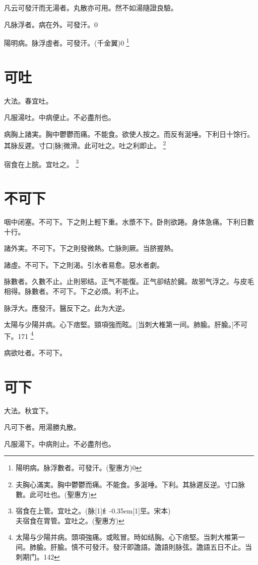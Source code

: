 \documentclass[11pt,oneside,b5paper]{ctexbook}
\begin{document}
\begin{flushleft}
凡云可發汗而无湯者。丸散亦可用。然不如湯隨證良驗。

凡脉浮者。病在外。可發汗。0

陽明病。脉浮虛者。可發汗。(千金翼)0
\footnote{陽明病。脉浮數者。可發汗。(聖惠方)0}

\section{可吐}

大法。春宜吐。

凡服湯吐。中病便止。不必盡剂也。

病胸上諸実。胸中鬱鬱而痛。不能食。欲使人按之。而反有涎唾。下利日十馀行。其脉反遲。寸口[脉]微滑。此可吐之。吐之利即止。
\footnote{夫胸心滿実。胸中鬱鬱而痛。不能食。多涎唾。下利。其脉遲反逆。寸口脉數。此可吐也。(聖惠方)}

宿食在上脘。宜吐之。
\footnote{宿食在上管。宜吐之。(脉{\hbox{\scalebox{0.68}[1]{纟}\kern-0.35em\scalebox{0.64}[1]{巠}}}。宋本)\\夫宿食在胃管。宜吐之。(聖惠方)}

\section{不可下}

咽中闭塞。不可下。下之則上輕下重。水漿不下。卧則欲踡。身体急痛。下利日數十行。

諸外実。不可下。下之則發微熱。亡脉則厥。当脐握熱。

諸虛。不可下。下之則渴。引水者易愈。惡水者劇。

脉數者。久數不止。止則邪结。正气不能復。正气卻结於臓。故邪气浮之。与皮毛相得。脉數者。不可下。下之必煩。利不止。

脉浮大。應發汗。醫反下之。此为大逆。

太陽与少陽并病。心下痞堅。頸項強而眩。[当刺大椎第一间。肺腧。肝腧。]不可下。171
\footnote{太陽与少陽并病。頭項強痛。或眩冒。時如结胸。心下痞堅。当刺大椎第一间。肺腧。肝腧。慎不可發汗。發汗即譫語。譫語則脉弦。譫語五日不止。当刺期门。142}

病欲吐者。不可下。

\section{可下}

大法。秋宜下。

凡可下者。用湯勝丸散。

凡服湯下。中病則止。不必盡剂也。


\end{flushleft}
\end{document}
